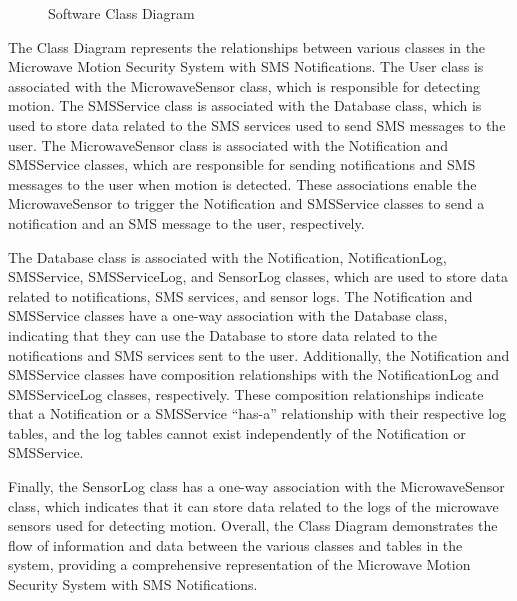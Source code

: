 \begin{figure}
    \caption{Software Class Diagram}\label{fig:figure}
\end{figure}


The Class Diagram represents the relationships between various classes in the
Microwave Motion Security System with SMS Notifications. %
The User class is associated with the MicrowaveSensor class, which is responsible for detecting motion. %
The SMSService class is associated with the Database class, which is used to store
data related to the SMS services used to send SMS messages to the user. %
The MicrowaveSensor class is associated with the Notification and SMSService classes,
which are responsible for sending notifications and SMS messages to the user when
motion is detected. %
These associations enable the MicrowaveSensor to trigger the Notification and SMSService classes to send a notification and an SMS message
to the user, respectively. %

The Database class is associated with the Notification, NotificationLog, SMSService,
SMSServiceLog, and SensorLog classes, which are used to store data related to
notifications, SMS services, and sensor logs. %
The Notification and SMSService classes have a one-way association with the Database class, indicating that they
can use the Database to store data related to the notifications and SMS services
sent to the user. %
Additionally, the Notification and SMSService classes have composition
relationships with the NotificationLog and SMSServiceLog classes, respectively. %
These composition relationships indicate that a Notification or a SMSService ``has-a''
relationship with their respective log tables, and the log tables cannot exist
independently of the Notification or SMSService. %

Finally, the SensorLog class has a one-way association with the MicrowaveSensor class,
which indicates that it can store data related to the logs of the microwave sensors
used for detecting motion. %
Overall, the Class Diagram demonstrates the flow of information and data between the various classes and tables in the system, providing a
comprehensive representation of the Microwave Motion Security System with
SMS Notifications. %


